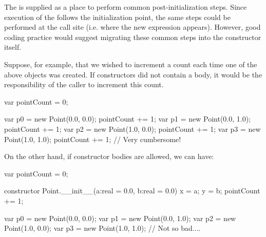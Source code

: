 \begin{rationale}
The  is supplied as a place to perform common
post-initialization steps.  Since execution of the 
follows the initialization point, the same steps could be performed at the call
site (i.e. where the new expression appears).  However, good coding practice
would suggest migrating these common steps into the constructor itself.

Suppose, for example, that we wished to increment a count each time one
of the above  objects was created.  If constructors did not contain
a body, it would be the responsibility of the caller to increment this count.
\begin{chapel}
var pointCount = 0;

var p0 = new Point(0.0, 0.0);
pointCount += 1;
var p1 = new Point(0.0, 1.0);
pointCount += 1;
var p2 = new Point(1.0, 0.0);
pointCount += 1;
var p3 = new Point(1.0, 1.0);
pointCount += 1;
// Very cumbersome!
\end{chapel}

On the other hand, if constructor bodies are allowed, we can have:
\begin{chapel}
var pointCount = 0;

constructor Point.__init__(a:real = 0.0, b:real = 0.0)
{ x = a; y = b; }
{ pointCount += 1; }

var p0 = new Point(0.0, 0.0);
var p1 = new Point(0.0, 1.0);
var p2 = new Point(1.0, 0.0);
var p3 = new Point(1.0, 1.0);
// Not so bad....
\end{chapel}
\end{rationale}

